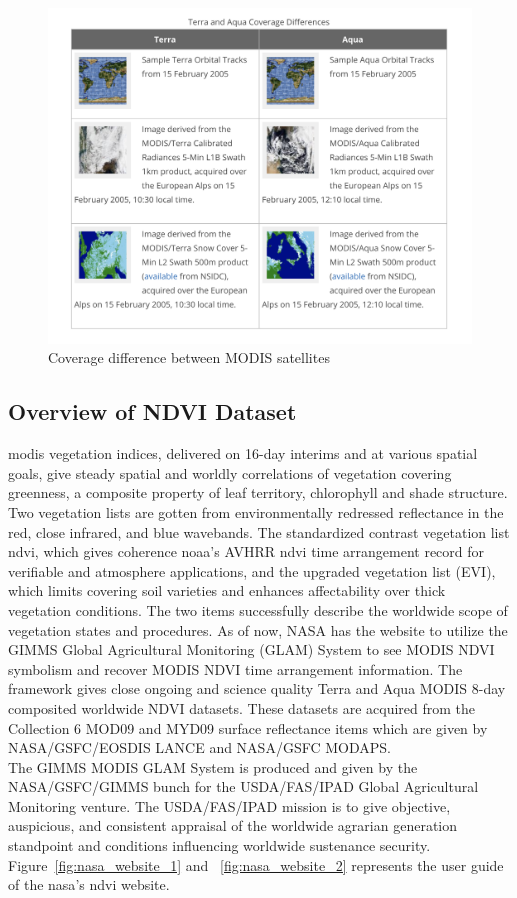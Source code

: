     \begin{figure}[H]
            \centering
            \includegraphics[width=1.0\linewidth]{figures/ch3/satellites.png}
            \caption{\label{fig:modis_satellites_difference} Coverage difference between MODIS satellites \cite{NSIDC}}
    \end{figure}

\subsection{Overview of NDVI Dataset}

\gls{modis} vegetation indices, delivered on 16-day interims and at various spatial goals, give steady spatial and worldly correlations of vegetation covering greenness, a composite property of leaf territory, chlorophyll and shade structure. Two vegetation lists are gotten from environmentally redressed reflectance in the red, close infrared, and blue wavebands. The standardized contrast vegetation list \gls{ndvi}, which gives coherence \gls{noaa}'s AVHRR \gls{ndvi} time arrangement record for verifiable and atmosphere applications, and the upgraded vegetation list (EVI), which limits covering soil varieties and enhances affectability over thick vegetation conditions. The two items successfully describe the worldwide scope of vegetation states and procedures. As of now, NASA has the website to utilize the GIMMS Global Agricultural Monitoring (GLAM) System to see MODIS NDVI symbolism and recover MODIS NDVI time arrangement information. The framework gives close ongoing and science quality Terra and Aqua MODIS 8-day composited worldwide NDVI datasets. These datasets are acquired from the Collection 6 MOD09 and MYD09 surface reflectance items which are given by NASA/GSFC/EOSDIS LANCE and NASA/GSFC MODAPS. \\
The GIMMS MODIS GLAM System is produced and given by the NASA/GSFC/GIMMS bunch for the USDA/FAS/IPAD Global Agricultural Monitoring venture. The USDA/FAS/IPAD mission is to give objective, auspicious, and consistent appraisal of the worldwide agrarian generation standpoint and conditions influencing worldwide sustenance security. Figure~\ref{fig:nasa_website_1} and ~\ref{fig:nasa_website_2} represents the user guide of the \gls{nasa}'s \gls{ndvi} website.

